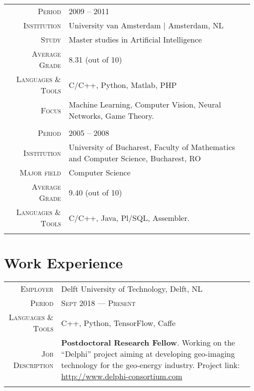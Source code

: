 \documentclass[a4paper, oneside, final]{scrartcl}
\newcommand{\gray}{\rowcolor[gray]{.90}}
\begin{document}
\begin{center}
\begin{tabular}{r@{\hskip 0.3in}p{11.3cm}}
			\gray \textsc{Period}       & \textsc{2009  -- 2011}\\
			\textsc{Institution}        & University van Amsterdam $\mid$ Amsterdam, NL\\
			\textsc{Study}              & Master studies in Artificial Intelligence\\
			\textsc{Average Grade}      & 8.31 (out of 10)\\
			\textsc{Languages \& Tools} & C\slash C++, Python, Matlab, PHP\\
			\textsc{Focus}              & Machine Learning, Computer Vision, Neural Networks, Game Theory.\\ 
			\multicolumn{2}{c}{}\\
	
			\gray \textsc{Period}       & \textsc{2005 -- 2008}\\
			\textsc{Institution}        & University of Bucharest, Faculty of Mathematics 
				and Computer Science, Bucharest, RO\\
			\textsc{Major field}        & Computer Science\\	
			\textsc{Average Grade}      & 9.40 (out of 10)\\
			\textsc{Languages \& Tools} & C\slash C++, Java, Pl\slash SQL, Assembler.\\ 
			\multicolumn{2}{c}{}\\
		\end{tabular}

		\section{Work Experience}
		\begin{tabular}{r@{\hskip 0.3in}p{11.3cm}}
			\gray \textsc{Employer}     & Delft University of Technology, Delft, NL\\
			\textsc{Period}             & \textsc{Sept 2018 --- Present} \\
			\textsc{Languages \& Tools} & C++, Python, TensorFlow, Caffe\\
			\textsc{Job Description}    & \textbf{Postdoctoral Research Fellow}. 
				Working on the ``Delphi'' project aiming at developing geo-imaging technology for the geo-energy industry. 
				Project link: \href{http://www.delphi-consortium.com}{http://www.delphi-consortium.com}\\
			\multicolumn{2}{c}{}\\ %


\end{tabular}
\end{center}
\end{document}

